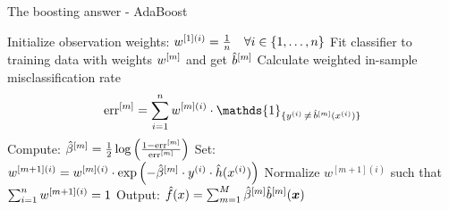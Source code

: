 \begin{vbframe}{The boosting answer - AdaBoost}
% 


\framebreak

\begin{algorithm}[H]
  \begin{algorithmic}[1]
    \State Initialize observation weights: $w^{[1](i)} = \frac{1}{n} \quad \forall i \in \{1, \ldots, n\}$
      \State Fit classifier to training data with weights $w^{[m]}$ and get $\hat{b}^{[m]}$
      \State Calculate weighted in-sample misclassification rate
      $$
        \errm = \sumin \wmi \cdot \mathds{1}_{\{\yi \,\neq\, \bmmh(\xi)\}}
      $$
      \State Compute: $ \hat{\beta}^{[m]} = \frac{1}{2} \log \left( \frac{1 - \text{err}^{[m]}}{\text{err}^{[m]}}\right)$
      \State Set: $w^{[m+1](i)} = w^{[m](i)} \cdot \exp\left(- \hat{\beta}^{[m]} \cdot
        y^{(i)} \cdot \hat{h}(x^{(i)})\right) $
      \State Normalize $w^{[m+1](i)}$ such that $\sum_{i=1}^n w^{[m+1](i)} = 1$
    \EndFor
    \State Output: $\hat{f}(x) = \sum_{m=1}^{M} \hat{\beta}^{[m]} \hat{b}^{[m]}(\bm{x})$
  \end{algorithmic}
  \caption{AdaBoost}
\end{algorithm}

\end{vbframe}

